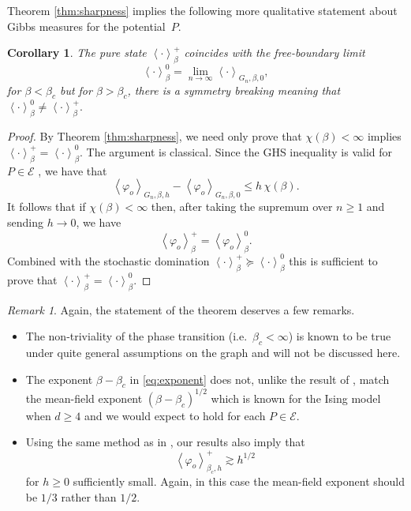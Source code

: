 \documentclass{article}
\newtheorem{corollary}[theorem]{Corollary}
\numberwithin{equation}{section}
\theoremstyle{definition}
\theoremstyle{definition}
\theoremstyle{remark}
\newtheorem{remark}{Remark}
\newcommand\vp{\varphi}
\newcommand\Ec{\mathcal{E}}
\begin{document}
Theorem \ref{thm:sharpness} implies the following more qualitative statement about Gibbs measures for the potential~$P$.
\begin{corollary}
The pure state $\left< \cdot \right>_{\beta}^+$ coincides with the free-boundary limit
\[
\left< \cdot \right>_{\beta}^0 = \lim_{n \to \infty} \left< \cdot \right>_{G_n,\beta,0},
\] 
for $\beta < \beta_c$ but for $\beta > \beta_c$, there is a symmetry breaking meaning that $\left< \cdot \right>_{\beta}^0 \neq \left< \cdot \right>_{\beta}^+.$
\end{corollary}
\begin{proof}
	By Theorem \ref{thm:sharpness}, we need only prove that $\chi(\beta) < \infty$ implies $\left< \cdot  \right>_{\beta}^{+} = \left< \cdot \right>_{\beta}^{0}$. The argument is classical. Since the GHS inequality is valid for $P \in \Ec$ \cite{ellis1976ghs}, we have that
	\[
	\left< \vp_o \right>_{G_n,\beta,h} - \left< \vp_o \right>_{G_n,\beta,0} \leq h \, \chi(\beta).
	\] 
	It follows that if $\chi(\beta) < \infty$ then, after taking the supremum over $n \geq 1$ and sending $h \to 0$, we have
	\begin{equation}
		\left< \vp_o \right>_{\beta}^{+} = \left< \vp_o \right>_{\beta}^{0}.
	\end{equation}
	Combined with the stochastic domination $\left< \cdot \right>_{\beta}^{+} \succeq \left< \cdot \right>_{\beta}^{0}$ \cite[Theorem 2.6.1]{simon2026phase} this is sufficient to prove that $\left< \cdot \right>_{\beta}^{+} = \left< \cdot \right>_{\beta}^{0}$. 
	
\end{proof}
\begin{remark} Again, the statement of the theorem deserves a few remarks. 
	\begin{itemize}	
\item The non-triviality of the phase transition (i.e.~$\beta_c < \infty$) is known to be true under quite general assumptions on the graph \cite{duminil2020existence,easo2025counting} and will not be discussed here. 
\item The exponent $\beta-\beta_c$ in \eqref{eq:exponent} does not, unlike the result of \cite{DCT}, match the mean-field exponent $(\beta-\beta_c)^{1 / 2}$ which is known for the Ising model when $d \geq 4$ \cite{AF} and we would expect to hold for each $P \in \Ec$.
\item Using the same method as in \cite[Lemma 2.8]{DCT}, our results also imply that
	\[
		\left< \vp_o \right>_{\beta_c,h}^{+} \gtrsim h^{1 / 2}
	\] 
	for $h \geq 0$ sufficiently small. Again, in this case the mean-field exponent should be $1 / 3$ rather than $1 / 2$. 
	\end{itemize}
\end{remark}
\end{document}
